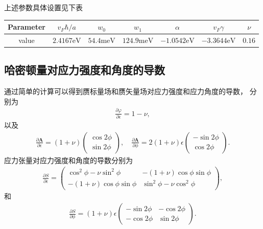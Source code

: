 \documentclass[10pt, oneside]{article}
\newcommand{\mr}[1]{\mathrm{#1}}
\begin{document}
上述参数具体设置见下表
\begin{table}[h!]
	\centering
	\begin{tabular}{c c c c c c c}
		\toprule
		Parameter & \(v_{F} \hbar/a\) & \(w_0\) & \(w_1\) & \(\alpha\) & \(v_{F} \gamma\) & \(\nu\) \\
		\midrule
		value & \(2.4167  \mr{eV}\) & \(54.4  \mr{meV}\) &  \(124.9 \mr{meV}\) &  \(-1.0542 \mr{eV}\) &  \( -3.3644 \mr{eV}\) & \(0.16\) \\
		\bottomrule
	\end{tabular}
\end{table}

\subsection{哈密顿量对应力强度和角度的导数}
通过简单的计算可以得到赝标量场和赝矢量场对应力强度和应力角度的导数， 分别为
\begin{align}
	\frac{\partial \varphi}{\partial \epsilon} = 1 - \nu,
\end{align}
以及
\begin{align}
	\frac{\partial \bm{A }}{\partial \epsilon} = \left(1 + \nu \right) \begin{pmatrix}
		\cos{2 \phi} \\ \sin{2 \phi}
	\end{pmatrix}, \quad \frac{\partial \bm{A }}{\partial \phi} = 2 \left(1 + \nu\right)  \epsilon\begin{pmatrix}
		- \sin{2 \phi} \\ \cos{2 \phi}		
	\end{pmatrix} .
\end{align}
应力张量对应力强度和角度的导数分别为
\begin{align}
	\frac{\partial S}{\partial \epsilon} = \begin{pmatrix}
		\cos^{2}{\phi}- \nu \sin^{2}{\phi} & - \left(1+ \nu\right) \cos{\phi} \sin{\phi} \\
		- \left(1+\nu\right) \cos{\phi} \sin{\phi} & \sin^{2}{\phi} - \nu \cos^{2}{\phi}		
	\end{pmatrix},
\end{align}
和
\begin{align}
	\frac{\partial S }{\partial \phi} = \left(1 + \nu\right) \epsilon \begin{pmatrix}
		- \sin{2 \phi} & - \cos{2 \phi} \\ - \cos{2 \phi} & \sin{2 \phi}
	\end{pmatrix}.
\end{align}
\end{document}
